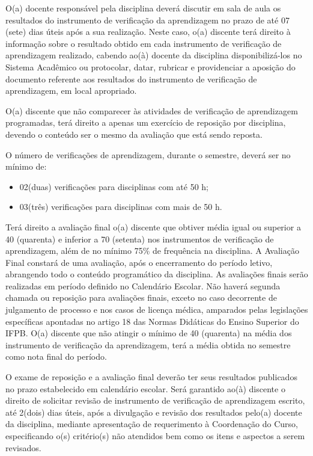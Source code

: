 	O(a) docente responsável pela disciplina deverá discutir em sala de aula os resultados do instrumento de verificação da aprendizagem no prazo de até 07 (sete) dias úteis após a sua realização. Neste caso, o(a) discente terá direito à informação sobre o resultado obtido em cada instrumento de verificação de aprendizagem realizado, cabendo ao(à) docente da disciplina disponibilizá-los no Sistema Acadêmico ou protocolar, datar, rubricar e providenciar a aposição do documento referente aos resultados do instrumento de verificação de aprendizagem, em local apropriado. 

	O(a) discente que não comparecer às atividades de verificação de aprendizagem programadas, terá direito a apenas um exercício de reposição por disciplina, devendo o conteúdo ser o mesmo da avaliação que está sendo reposta.

	O número de verificações de aprendizagem, durante o semestre, deverá ser no mínimo de: 

\begin{itemize}
	\item 02(duas) verificações para disciplinas com até 50 h; 
	\item 03(três) verificações para disciplinas com mais de 50 h. 
\end{itemize}

	Terá direito a avaliação final o(a) discente que obtiver média igual ou superior a 40 (quarenta) e inferior a 70 (setenta) nos instrumentos de verificação de aprendizagem, além de no mínimo 75\% de frequência na disciplina. A Avaliação Final constará de uma avaliação, após o encerramento do período letivo, abrangendo todo o conteúdo programático da disciplina. As avaliações finais serão realizadas em período definido no Calendário Escolar. Não haverá segunda chamada ou reposição para avaliações finais, exceto no caso decorrente de julgamento de processo e nos casos de licença médica, amparados pelas legislações específicas apontadas no artigo 18 das Normas Didáticas do Ensino Superior do IFPB. O(a) discente que não atingir o mínimo de 40 (quarenta) na média dos instrumento de verificação da aprendizagem, terá a média obtida no semestre como nota final do período. 

	O exame de reposição e a avaliação final deverão ter seus resultados publicados no prazo estabelecido em calendário escolar. Será garantido ao(à) discente o direito de solicitar revisão de instrumento de verificação de aprendizagem escrito, até 2(dois) dias úteis, após a divulgação e revisão dos resultados pelo(a) docente da disciplina, mediante apresentação de requerimento à Coordenação do Curso, especificando o(s) critério(s) não atendidos bem como os itens e aspectos a serem revisados. 
	
